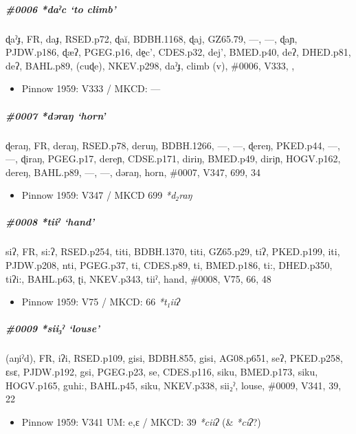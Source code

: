 \documentclass[a4paper,]{article}
\providecommand{\tightlist}{%
  \setlength{\itemsep}{0pt}\setlength{\parskip}{0pt}}
\let\oldsubparagraph\subparagraph
\renewcommand{\subparagraph}[1]{\oldsubparagraph{#1}\mbox{}}
\begin{document}
\subparagraph{\texorpdfstring{\#0006 \emph{*daˀc} `to
climb'}{\#0006 *daˀc to climb}}\label{daux2c0c-to-climb}

ɖaˀɟ, FR, daɟ, RSED.p72, ɖaĭ, BDBH.1168, ɖaj, GZ65.79, ---, ---, ɖaɲ,
PJDW.p186, ɖæʔ, PGEG.p16, de̠c', CDES.p32, dej', BMED.p40, deʔ, DHED.p81,
deʔ, BAHL.p89, (cuɖe), NKEV.p298, daˀɟ, climb (v), \#0006, V333, ,

\begin{itemize}
\tightlist
\item
  Pinnow 1959: V333 / MKCD: ---
\end{itemize}

\subparagraph{\texorpdfstring{\#0007 \emph{*dəraŋ}
`horn'}{\#0007 *dəraŋ horn}}\label{dux259raux14b-horn}

ɖeraŋ, FR, deraŋ, RSED.p78, deruŋ, BDBH.1266, ---, ---, ɖereŋ, PKED.p44,
---, ---, ɖiraŋ, PGEG.p17, dereɲ, CDSE.p171, diriŋ, BMED.p49, diriɲ,
HOGV.p162, dereŋ, BAHL.p89, ---, ---, dəraŋ, horn, \#0007, V347, 699, 34

\begin{itemize}
\tightlist
\item
  Pinnow 1959: V347 / MKCD 699 \emph{*d₂raŋ}
\end{itemize}

\subparagraph{\texorpdfstring{\#0008 \emph{*tiiˀ}
`hand'}{\#0008 *tiiˀ hand}}\label{tiiux2c0-hand}

siʔ, FR, si:ʔ, RSED.p254, titi, BDBH.1370, titi, GZ65.p29, tiʔ,
PKED.p199, iti, PJDW.p208, nti, PGEG.p37, ti, CDES.p89, ti, BMED.p186,
ti:, DHED.p350, tiʔi:, BAHL.p63, ʈi, NKEV.p343, tiiˀ, hand, \#0008, V75,
66, 48

\begin{itemize}
\tightlist
\item
  Pinnow 1959: V75 / MKCD: 66 \emph{*t₁iiʔ}
\end{itemize}

\subparagraph{\texorpdfstring{\#0009 \emph{*sii₃ˀ}
`louse'}{\#0009 *sii₃ˀ louse}}\label{siiux2c0-louse}

(aŋiˀd), FR, iʔi, RSED.p109, gisi, BDBH.855, gisi, AG08.p651, seʔ,
PKED.p258, ɛsɛ, PJDW.p192, gsi, PGEG.p23, se, CDES.p116, siku,
BMED.p173, siku, HOGV.p165, guhi:, BAHL.p45, siku, NKEV.p338, sii₂ˀ,
louse, \#0009, V341, 39, 22

\begin{itemize}
\tightlist
\item
  Pinnow 1959: V341 UM: e,ɛ / MKCD: 39 \emph{*ciiʔ} (\& \emph{*ciʔ}?)
\end{itemize}
\end{document}

